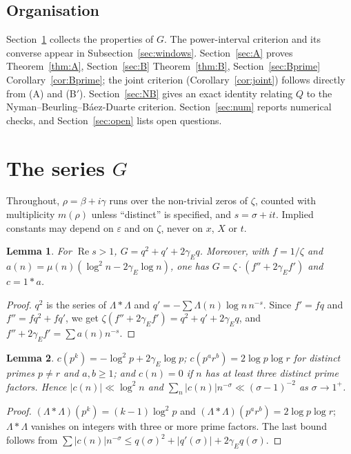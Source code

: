 \documentclass[11pt]{amsart}
\newtheorem{lemma}{Lemma}[section]
\theoremstyle{remark}
\theoremstyle{definition}
\newcommand{\Lam}{\Lambda}
\newcommand{\gE}{\gamma_E}
\renewcommand{\Re}{\operatorname{Re}}
\begin{document}
\subsection*{Organisation} Section~\ref{sec:G} collects the properties of $G$. The power-interval criterion and its converse appear in Subsection~\ref{sec:windows}. Section~\ref{sec:A} proves Theorem~\ref{thm:A}, Section~\ref{sec:B} Theorem~\ref{thm:B}, Section~\ref{sec:Bprime} Corollary~\ref{cor:Bprime}; the joint criterion (Corollary~\ref{cor:joint}) follows directly from (A) and (B$'$). Section~\ref{sec:NB} gives an exact identity relating $Q$ to the Nyman--Beurling--B\'aez-Duarte criterion. Section~\ref{sec:num} reports numerical checks, and Section~\ref{sec:open} lists open questions.

\section{The series $G$}\label{sec:G}

Throughout, $\rho=\beta+i\gamma$ runs over the non-trivial zeros of $\zeta$, counted with multiplicity $m(\rho)$ unless ``distinct'' is specified, and $s=\sigma+it$. Implied constants may depend on $\varepsilon$ and on $\zeta$, never on $x$, $X$ or $t$.

\begin{lemma}\label{lem:gen}
For $\Re s>1$, $G=q^2+q'+2\gE q$. Moreover, with $f=1/\zeta$ and $a(n)=\mu(n)(\log^2n-2\gE\log n)$, one has $G=\zeta\cdot(f''+2\gE f')$ and $c=1*a$.
\end{lemma}
\begin{proof}
$q^2$ is the series of $\Lam*\Lam$ and $q'=-\sum\Lam(n)\log n\,n^{-s}$. Since $f'=fq$ and $f''=fq^2+fq'$, we get $\zeta(f''+2\gE f')=q^2+q'+2\gE q$, and $f''+2\gE f'=\sum a(n)n^{-s}$.
\end{proof}

\begin{lemma}\label{lem:support}
$c(p^k)=-\log^2p+2\gE\log p$; $c(p^ar^b)=2\log p\log r$ for distinct primes $p\ne r$ and $a,b\ge1$; and $c(n)=0$ if $n$ has at least three distinct prime factors. Hence $|c(n)|\ll\log^2n$ and $\sum_n|c(n)|n^{-\sigma}\ll(\sigma-1)^{-2}$ as $\sigma\to1^+$.
\end{lemma}
\begin{proof}
$(\Lam*\Lam)(p^k)=(k-1)\log^2p$ and $(\Lam*\Lam)(p^ar^b)=2\log p\log r$; $\Lam*\Lam$ vanishes on integers with three or more prime factors. The last bound follows from $\sum|c(n)|n^{-\sigma}\le q(\sigma)^2+|q'(\sigma)|+2\gE q(\sigma)$.
\end{proof}
\end{document}
